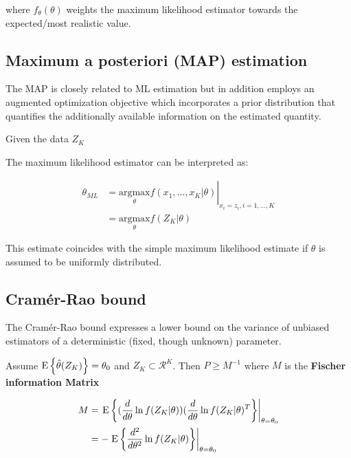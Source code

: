 \documentclass[10pt,a4paper]{scrartcl}
\begin{document}
\begin{multicols*}{2}

where $f_\theta(\theta)$ weights the maximum likelihood estimator towards the expected/most realistic value.

\subsection{Maximum a posteriori (MAP) estimation}

The MAP is closely related to ML estimation but in addition employs an augmented optimization objective which incorporates a prior distribution that quantifies the additionally available information on the estimated quantity.

Given the data $Z_K$


The maximum likelihood estimator can be interpreted as:

\begin{align*}
\theta_{ML}&=\left.\underset{\theta}{\text{argmax}}f(x_1,\ldots,x_K|\theta)\right|_{x_i=z_i,i=1,\ldots,K}\\
&=\underset{\theta}{\text{argmax}}f(Z_K|\theta)
\end{align*}

This estimate coincides with the simple maximum likelihood estimate if $\theta$ is assumed to be uniformly distributed.

\subsection{Cramér-Rao bound}

The Cramér-Rao bound expresses a lower bound on the variance of unbiased estimators of a deterministic (fixed, though unknown) parameter.


Assume $\text{E}\left\{\hat{\theta}(Z_K)\right\}=\theta_0$ and $Z_K\subset\mathcal{R}^K$. Then $P\geq M^{-1}$ where $M$ is the \textbf{Fischer information Matrix}

\begin{align*}
M&=\left.\text{E}\left\{(\frac{d}{d\theta}\ln f(Z_K|\theta))(\frac{d}{d\theta}\ln f(Z_K|\theta)^T\right\}\right|_{\theta=\theta_0}\\
&=-\left.\text{E}\left\{\frac{d^2}{d\theta^2}\ln f(Z_K|\theta)\right\}\right|_{\theta=\theta_0}
\end{align*}


\end{multicols*}
\end{document}
